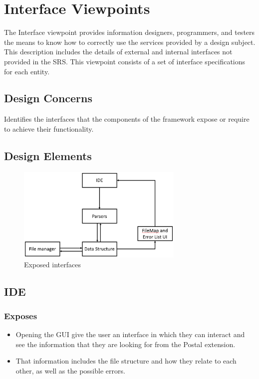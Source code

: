 \documentclass[letterpaper,10pt,titlepage,draftclsnofoot,onecolumn,onesided] {IEEEtran}
\begin{document}
\section{Interface Viewpoints}
The Interface viewpoint provides information designers, programmers, and testers the means to know how
to correctly use the services provided by a design subject. This description includes the details of external
and internal interfaces not provided in the SRS. This viewpoint consists of a set of interface specifications
for each entity.

\subsection{Design Concerns}
Identifies the interfaces that the components of the framework expose or require to achieve their
functionality. 

\subsection{Design Elements}
\begin{figure}
	\includegraphics[width=300px]{InterfaceUMLEPS.eps}
	\caption{Exposed interfaces}
\end{figure}

\subsection{IDE}
	
\subsubsection{Exposes}
\begin{itemize}
	\item Opening the GUI give the user an interface in which they can interact and see the information that they are looking for from the Postal extension.
	\item That information includes the file structure and how they relate to each other, as well as the possible errors. 
\end{itemize}
		
\end{document}
